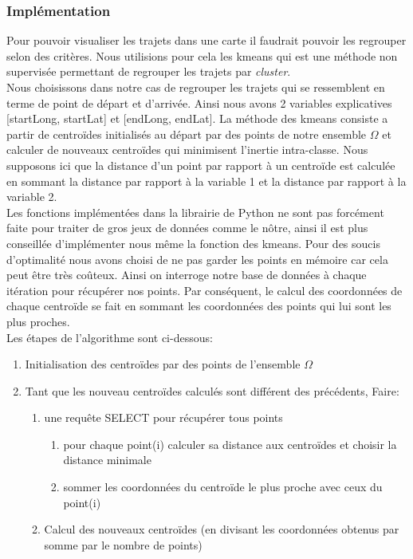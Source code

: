 \documentclass[]{report}
\begin{document}
	\subsubsection{Implémentation}
	Pour pouvoir visualiser les trajets dans une carte il faudrait pouvoir les regrouper selon des critères. Nous utilisions pour cela  les kmeans qui est une méthode non supervisée permettant de regrouper les trajets par \textit{cluster}. \\
	Nous choisissons dans notre cas de regrouper les trajets qui se ressemblent en terme de point de départ et d'arrivée. Ainsi nous avons 2 variables explicatives [startLong, startLat] et [endLong, endLat].
	La méthode des kmeans consiste a partir de centroïdes initialisés au départ par des points de notre ensemble $\Omega$ et calculer de nouveaux centroïdes qui minimisent l'inertie intra-classe. Nous supposons ici que la distance d'un point par rapport à un centroïde est calculée en sommant la distance par rapport à la variable 1 et la distance par rapport à la variable 2.\\
	Les fonctions implémentées dans la librairie de Python ne sont pas forcément faite pour traiter de gros jeux de données comme le nôtre, ainsi il est plus conseillée d'implémenter nous même la fonction des kmeans. Pour des soucis d'optimalité nous avons choisi de ne pas garder les points en mémoire car cela peut être très coûteux. Ainsi on interroge notre base de données à chaque itération pour récupérer nos points. Par conséquent, le calcul  des coordonnées de chaque centroïde se fait en sommant les coordonnées des points qui lui sont les plus proches. \\
	Les étapes de l'algorithme sont  ci-dessous:
	\begin{enumerate}
		\item Initialisation des centroïdes par des points de l'ensemble $\Omega$
		\item Tant que les nouveau centroïdes calculés sont différent des précédents, Faire:
		\begin{enumerate}
			\item une requête SELECT pour récupérer tous points
			\begin{enumerate}
				\item pour chaque point(i) calculer sa distance aux centroïdes et choisir la distance minimale
				\item sommer les coordonnées du centroïde le plus proche avec ceux du point(i)
			\end{enumerate}
			\item Calcul des nouveaux centroïdes (en divisant les coordonnées obtenus par somme par le nombre de points)
		\end{enumerate}
	\end{enumerate}
	
\end{document}
